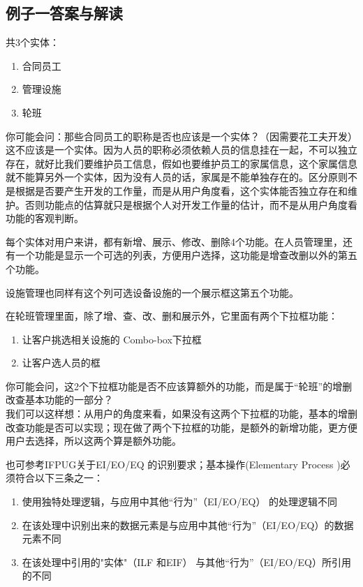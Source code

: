 \hypertarget{ux4f8bux5b50ux4e00ux7b54ux6848ux4e0eux89e3ux8bfb}{%
\subsection{例子一答案与解读}\label{ux4f8bux5b50ux4e00ux7b54ux6848ux4e0eux89e3ux8bfb}}

共3个实体：

\begin{enumerate}
\tightlist
\item
  合同员工
\item
  管理设施
\item
  轮班
\end{enumerate}

你可能会问：那些合同员工的职称是否也应该是一个实体？（因需要花工夫开发）\\
这不应该是一个实体。因为人员的职称必须依赖人员的信息挂在一起，不可以独立存在，就好比我们要维护员工信息，假如也要维护员工的家属信息，这个家属信息就不能算另外一个实体，因为没有人员的话，家属是不能单独存在的。区分原则不是根据是否要产生开发的工作量，而是从用户角度看，这个实体能否独立存在和维护。否则功能点的估算就只是根据个人对开发工作量的估计，而不是从用户角度看功能的客观判断。

每个实体对用户来讲，都有新增、展示、修改、删除4个功能。在人员管理里，还有一个功能是显示一个可选的列表，方便用户选择，这功能是增查改删以外的第五个功能。

设施管理也同样有这个列可选设备设施的一个展示框这第五个功能。

在轮班管理里面，除了增、查、改、删和展示外，它里面有两个下拉框功能： 

\begin{enumerate}
\tightlist
\item
  让客户挑选相关设施的 Combo-box下拉框
\item
  让客户选人员的框
\end{enumerate}

你可能会问，这2个下拉框功能是否不应该算额外的功能，而是属于``轮班''的增删改查基本功能的一部分？\\
我们可以这样想：从用户的角度来看，如果没有这两个下拉框的功能，基本的增删改查功能是否可以实现；现在做了两个下拉框的功能，是额外的新增功能，更方便用户去选择，所以这两个算是额外功能。

也可参考IFPUG关于EI/EO/EQ 的识别要求；基本操作(Elementary Process
)必须符合以下三条之一：

\begin{enumerate}
\tightlist
\item
  使用独特处理逻辑，与应用中其他``行为''（EI/EO/EQ） 的处理逻辑不同
\item
  在该处理中识别出来的数据元素是与应用中其他``行为''（EI/EO/EQ）的数据元素不同
\item
  在该处理中引用的"实体"（ILF 和EIF）
  与其他``行为''（EI/EO/EQ）所引用的不同
\end{enumerate}

